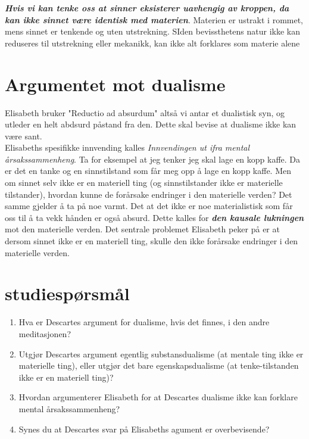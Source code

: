 \documentclass[11pt, a4paper]{article}
\begin{document}
\textbf{\textit{Hvis vi kan tenke oss at sinner eksisterer uavhengig av kroppen, da kan ikke sinnet være identisk med materien}}. Materien er ustrakt i rommet, mens sinnet er tenkende og uten utstrekning. SIden bevissthetens natur ikke kan reduseres til utstrekning eller mekanikk, kan ikke alt forklares som materie alene



\section{Argumentet mot dualisme}

Elisabeth bruker "Reductio ad absurdum" altså vi antar et dualistisk syn, og utleder en helt abdsurd påstand fra den. Dette skal bevise at dualisme ikke kan være sant.\\

Elisabeths spesifikke innvending kalles \textit{Innvendingen ut ifra mental årsakssammenheng}. Ta for eksempel at jeg tenker jeg skal lage en kopp kaffe. Da er det en tanke og en sinnstilstand som får meg opp å lage en kopp kaffe. Men om sinnet selv ikke er en materiell ting (og sinnstilstander ikke er materielle tilstander), hvordan kunne de forårsake endringer i den materielle verden? Det samme gjelder å ta på noe varmt. Det at det ikke er noe materialistisk som får oss til å ta vekk hånden er også absurd. Dette kalles for \textbf{\textit{den kausale lukningen}} mot den materielle verden. Det sentrale problemet Elisabeth peker på er at dersom sinnet ikke er en materiell ting, skulle den ikke forårsake endringer i den materielle verden.


\section{studiespørsmål}

\begin{enumerate}
    \item Hva er Descartes argument for dualisme, hvis det finnes, i den andre meditasjonen?
    \item Utgjør Descartes argument egentlig substansdualisme (at mentale ting ikke er materielle ting), eller utgjør det bare egenskapsdualisme (at tenke-tilstanden ikke er en materiell ting)?
    \item Hvordan argumenterer Elisabeth for at Descartes dualisme ikke kan forklare mental årsakssammenheng?
    \item Synes du at Descartes svar på Elisabeths agument er overbevisende?
\end{enumerate}
\end{document}
